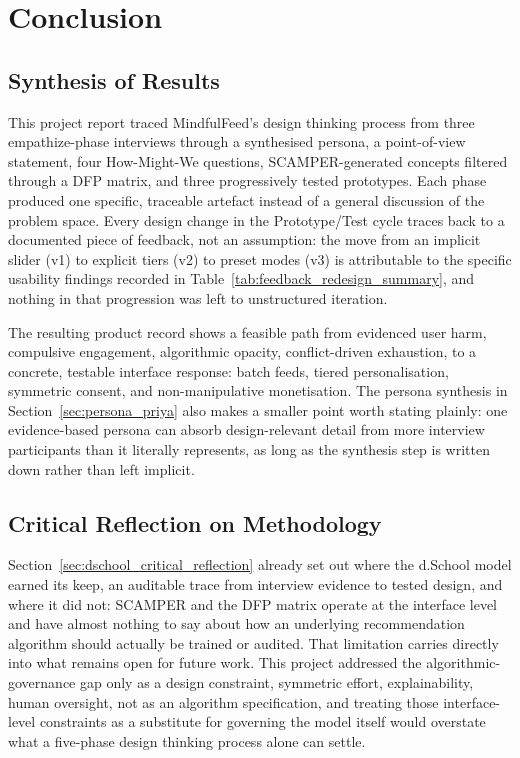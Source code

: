 \documentclass[11pt]{article}
\begin{document}
\section{Conclusion}

\subsection{Synthesis of Results}
This project report traced MindfulFeed's design thinking process from three empathize-phase interviews through a synthesised persona, a point-of-view statement, four How-Might-We questions, SCAMPER-generated concepts filtered through a DFP matrix, and three progressively tested prototypes. Each phase produced one specific, traceable artefact instead of a general discussion of the problem space. Every design change in the Prototype/Test cycle traces back to a documented piece of feedback, not an assumption: the move from an implicit slider (v1) to explicit tiers (v2) to preset modes (v3) is attributable to the specific usability findings recorded in Table~\ref{tab:feedback_redesign_summary}, and nothing in that progression was left to unstructured iteration.

The resulting product record shows a feasible path from evidenced user harm, compulsive engagement, algorithmic opacity, conflict-driven exhaustion, to a concrete, testable interface response: batch feeds, tiered personalisation, symmetric consent, and non-manipulative monetisation. The persona synthesis in Section~\ref{sec:persona_priya} also makes a smaller point worth stating plainly: one evidence-based persona can absorb design-relevant detail from more interview participants than it literally represents, as long as the synthesis step is written down rather than left implicit.

\subsection{Critical Reflection on Methodology}
Section~\ref{sec:dschool_critical_reflection} already set out where the d.School model earned its keep, an auditable trace from interview evidence to tested design, and where it did not: SCAMPER and the DFP matrix operate at the interface level and have almost nothing to say about how an underlying recommendation algorithm should actually be trained or audited. That limitation carries directly into what remains open for future work. This project addressed the algorithmic-governance gap only as a design constraint, symmetric effort, explainability, human oversight, not as an algorithm specification, and treating those interface-level constraints as a substitute for governing the model itself would overstate what a five-phase design thinking process alone can settle.
\end{document}
